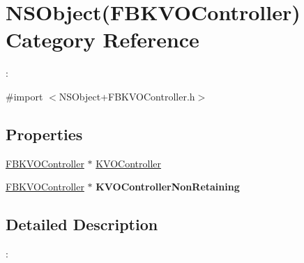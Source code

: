 \hypertarget{category_n_s_object_07_f_b_k_v_o_controller_08}{\section{N\+S\+Object(F\+B\+K\+V\+O\+Controller) Category Reference}
\label{category_n_s_object_07_f_b_k_v_o_controller_08}
}


\+:  




{\ttfamily \#import $<$N\+S\+Object+\+F\+B\+K\+V\+O\+Controller.\+h$>$}

\subsection*{Properties}
\begin{DoxyCompactItemize}
\item 
\hyperlink{interface_f_b_k_v_o_controller}{F\+B\+K\+V\+O\+Controller} $\ast$ \hyperlink{category_n_s_object_07_f_b_k_v_o_controller_08_aa95ad60ae38e9a30b495e54faedeed23}{K\+V\+O\+Controller}
\item 
\hypertarget{category_n_s_object_07_f_b_k_v_o_controller_08_aab902cfd4f5e64d84693b6c179514009}{\hyperlink{interface_f_b_k_v_o_controller}{F\+B\+K\+V\+O\+Controller} $\ast$ {\bfseries K\+V\+O\+Controller\+Non\+Retaining}}\label{category_n_s_object_07_f_b_k_v_o_controller_08_aab902cfd4f5e64d84693b6c179514009}

\end{DoxyCompactItemize}


\subsection{Detailed Description}
\+: 

